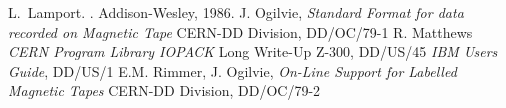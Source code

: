 
\setlongtables
\makeindex
{}
\def\condbreak#1{\par}
\PScommands%
\setcounter{secnumdepth}{3}
\setcounter{tocdepth}{2}


\setcounter{page}{1}





\begin{thebibliography}{10}
L.~Lamport.
.
\newblock Addison-Wesley, 1986.
J. Ogilvie, 
\newblock \textit{Standard Format for data recorded on Magnetic Tape}
\newblock CERN-DD Division, DD/OC/79-1
R. Matthews
\newblock \textit{CERN Program Library  IOPACK}
\newblock Long Write-Up Z-300,   DD/US/45
\textit{IBM Users Guide},  DD/US/1
E.M. Rimmer, J. Ogilvie, 
\newblock \textit{On-Line Support for Labelled Magnetic Tapes}
\newblock CERN-DD Division, DD/OC/79-2
\end{thebibliography}

\printindex


